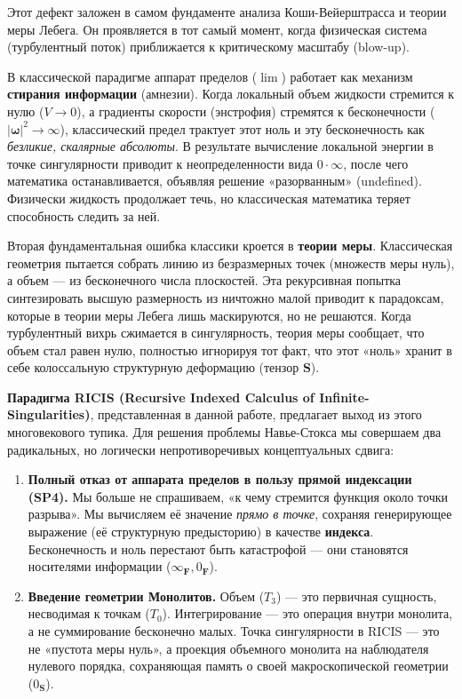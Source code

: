 \documentclass[12pt]{article}
\newcommand{\0}{\mathbf{0}}
\newcommand{\1}{\mathds{1}}
\newcommand{\bomega}{\bm{\omega}}
\newcommand{\bS}{\mathbf{S}}
\newcommand{\bF}{\mathbf{F}}
\begin{document}
Этот дефект заложен в самом фундаменте анализа Коши-Вейерштрасса и теории меры Лебега. Он проявляется в тот самый момент, когда физическая система (турбулентный поток) приближается к критическому масштабу (blow-up).

В классической парадигме аппарат пределов ($\lim$) работает как механизм \textbf{стирания информации} (амнезии). Когда локальный объем жидкости стремится к нулю ($V \to 0$), а градиенты скорости (энстрофия) стремятся к бесконечности ($|\bomega|^2 \to \infty$), классический предел трактует этот ноль и эту бесконечность как \textit{безликие, скалярные абсолюты}. В результате вычисление локальной энергии в точке сингулярности приводит к неопределенности вида $0 \cdot \infty$, после чего математика останавливается, объявляя решение «разорванным» (undefined). Физически жидкость продолжает течь, но классическая математика теряет способность следить за ней.

Вторая фундаментальная ошибка классики кроется в \textbf{теории меры}. Классическая геометрия пытается собрать линию из безразмерных точек (множеств меры нуль), а объем --- из бесконечного числа плоскостей. Эта рекурсивная попытка синтезировать высшую размерность из ничтожно малой приводит к парадоксам, которые в теории меры Лебега лишь маскируются, но не решаются. Когда турбулентный вихрь сжимается в сингулярность, теория меры сообщает, что объем стал равен нулю, полностью игнорируя тот факт, что этот «ноль» хранит в себе колоссальную структурную деформацию (тензор $\bS$).

\textbf{Парадигма RICIS (Recursive Indexed Calculus of Infinite-Singularities)}, представленная в данной работе, предлагает выход из этого многовекового тупика. Для решения проблемы Навье-Стокса мы совершаем два радикальных, но логически непротиворечивых концептуальных сдвига:

\begin{enumerate}
    \item \textbf{Полный отказ от аппарата пределов в пользу прямой индексации (SP4).} Мы больше не спрашиваем, «к чему стремится функция около точки разрыва». Мы вычисляем её значение \textit{прямо в точке}, сохраняя генерирующее выражение (её структурную предысторию) в качестве \textbf{индекса}. Бесконечность и ноль перестают быть катастрофой --- они становятся носителями информации ($\infty_{\bF}, 0_{\bF}$).
    \item \textbf{Введение геометрии Монолитов.} Объем ($T_3$) --- это первичная сущность, несводимая к точкам ($T_0$). Интегрирование --- это операция внутри монолита, а не суммирование бесконечно малых. Точка сингулярности в RICIS --- это не «пустота меры нуль», а проекция объемного монолита на наблюдателя нулевого порядка, сохраняющая память о своей макроскопической геометрии ($0_{\bS}$).
\end{enumerate}
\end{document}
